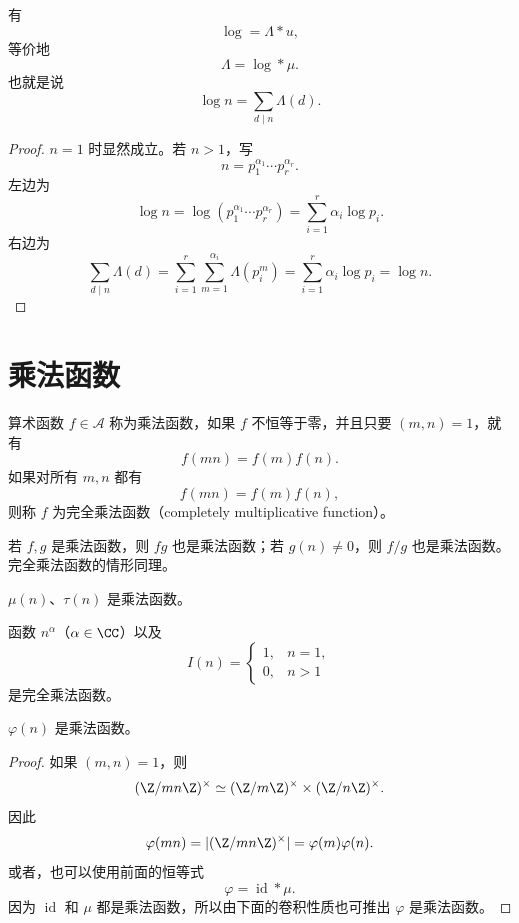 \begin{example}
	有
	\[
		\log=\Lambda*u,
	\]
	等价地
	\[
		\Lambda=\log*\mu.
	\]
	也就是说
	\[
		\log n=\sum_{d\mid n}\Lambda(d).
	\]
\end{example}

\begin{proof}
	$n=1$ 时显然成立。若 $n>1$，写
	\[
		n=p_1^{\alpha_1}\cdots p_r^{\alpha_r}.
	\]
	左边为
	\[
		\log n
		=
		\log\left(p_1^{\alpha_1}\cdots p_r^{\alpha_r}\right)
		=
		\sum_{i=1}^r \alpha_i\log p_i.
	\]
	右边为
	\[
		\sum_{d\mid n}\Lambda(d)
		=
		\sum_{i=1}^r\sum_{m=1}^{\alpha_i}\Lambda(p_i^m)
		=
		\sum_{i=1}^r\alpha_i\log p_i
		=
		\log n.
	\]
\end{proof}

\section{乘法函数}

\begin{definition}
	算术函数 $f\in\mathcal A$ 称为乘法函数，如果 $f$ 不恒等于零，并且只要 $(m,n)=1$，就有
	\[
		f(mn)=f(m)f(n).
	\]
	如果对所有 $m,n$ 都有
	\[
		f(mn)=f(m)f(n),
	\]
	则称 $f$ 为完全乘法函数（completely multiplicative function）。
\end{definition}

\begin{corollary}
	若 $f,g$ 是乘法函数，则 $fg$ 也是乘法函数；若 $g(n)\neq 0$，则 $f/g$ 也是乘法函数。完全乘法函数的情形同理。
\end{corollary}

\begin{example}
	$\mu(n)$、$\tau(n)$ 是乘法函数。
\end{example}

\begin{example}
	函数 $n^\alpha$（$\alpha\in\CC$）以及
	\[
		I(n)=
		\begin{cases}
			1, & n=1,\\
			0, & n>1
		\end{cases}
	\]
	是完全乘法函数。
\end{example}

\begin{example}
	$\varphi(n)$ 是乘法函数。
\end{example}

\begin{proof}
	如果 $(m,n)=1$，则
	\[
		(\Z/mn\Z)^\times
		\simeq
		(\Z/m\Z)^\times\times(\Z/n\Z)^\times.
	\]
	因此
	\[
		\varphi(mn)=|(\Z/mn\Z)^\times|
		=\varphi(m)\varphi(n).
	\]
	或者，也可以使用前面的恒等式
	\[
		\varphi=\operatorname{id}*\mu.
	\]
	因为 $\operatorname{id}$ 和 $\mu$ 都是乘法函数，所以由下面的卷积性质也可推出 $\varphi$ 是乘法函数。
\end{proof}

